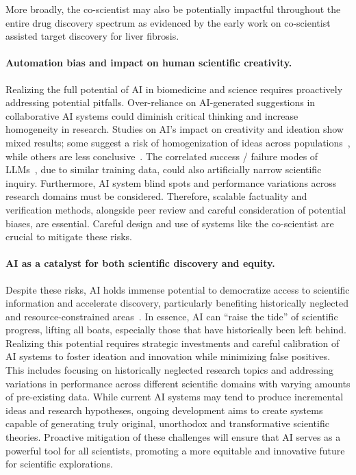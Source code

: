 More broadly, the co-scientist may also be potentially impactful throughout the entire drug discovery spectrum as evidenced by the early work on co-scientist assisted target discovery for liver fibrosis. 

\paragraph{Automation bias and impact on human scientific creativity.} 
Realizing the full potential of AI in biomedicine and science requires proactively addressing potential pitfalls. Over-reliance on AI-generated suggestions in collaborative AI systems could diminish critical thinking and increase homogeneity in research. Studies on AI's impact on creativity and ideation show mixed results; some suggest a risk of homogenization of ideas across populations~\citep{homogeneity_ideas}, while others are less conclusive~\citep{ashkinaze2024aiideasaffectcreativity}. The correlated success / failure modes of LLMs~\citep{wenger2025weredifferentweresame}, due to similar training data, could also artificially narrow scientific inquiry. Furthermore, AI system blind spots and performance variations across research domains must be considered. Therefore, scalable factuality and verification methods, alongside peer review and careful consideration of potential biases, are essential. Careful design and use of systems like the co-scientist are crucial to mitigate these risks.

\paragraph{AI as a catalyst for both scientific discovery and equity.}
Despite these risks, AI holds immense potential to democratize access to scientific information and accelerate discovery, particularly benefiting historically neglected and resource-constrained areas~\citep{sun2018addressing, george2023addressing}. In essence, AI can ``raise the tide'' of scientific progress, lifting all boats, especially those that have historically been left behind. Realizing this potential requires strategic investments and careful calibration of AI systems to foster ideation and innovation while minimizing false positives. This includes focusing on historically neglected research topics and addressing variations in performance across different scientific domains with varying amounts of pre-existing data. While current AI systems may tend to produce incremental ideas and research hypotheses, ongoing development aims to create systems capable of generating truly original, unorthodox and transformative scientific theories. Proactive mitigation of these challenges will ensure that AI serves as a powerful tool for all scientists, promoting a more equitable and innovative future for scientific explorations.

